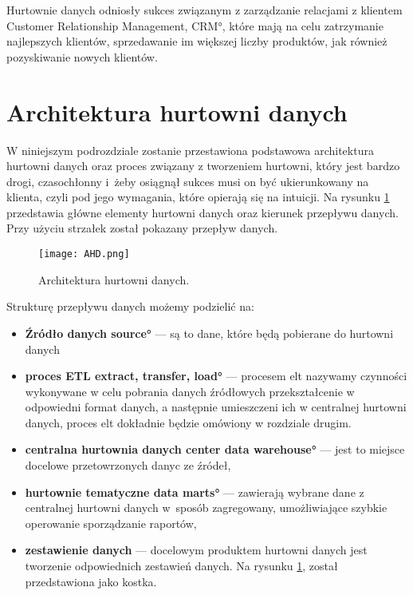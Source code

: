 Hurtownie danych odniosły sukces związanym z zarządzanie relacjami z klientem 
 \ang{Customer Relationship Management, CRM}, które mają na celu zatrzymanie najlepszych klientów,
 sprzedawanie im większej liczby produktów, jak również pozyskiwanie nowych klientów.

\section{Architektura hurtowni danych} \label{p_temat}
  W niniejszym podrozdziale zostanie przestawiona podstawowa architektura hurtowni danych oraz 
   proces związany z tworzeniem hurtowni, który jest bardzo drogi, czasochłonny 
   i~żeby osiągnął sukces musi on być ukierunkowany na klienta, czyli pod jego wymagania, 
   które opierają się na intuicji.
   Na rysunku \ref{fig:AHD} przedstawia główne elementy hurtowni danych oraz kierunek przepływu danych. Przy użyciu 
   strzałek został pokazany przepływ danych.

\begin{center}
\begin{figure}[H]
  \begin{center}
    \texttt{[image: AHD.png]}
  \end{center}
 \caption{Architektura hurtowni danych. }
    \label{fig:AHD}
\end{figure}
\end{center}


Strukturę przepływu danych możemy podzielić na:
\begin{itemize}
 \item \textbf{Źródło danych \ang{source} } --- 
        są to dane, które będą pobierane do hurtowni danych 
 \item \textbf{proces ETL \ang{extract, transfer, load} } --- 
    procesem elt nazywamy czynności wykonywane w celu pobrania danych źródłowych
    przekształcenie w odpowiedni format danych, a następnie umieszczeni ich w centralnej hurtowni danych,
    proces elt dokładnie będzie omówiony w rozdziale drugim.
 \item \textbf{centralna hurtownia danych \ang{center data  warehouse}} --- 
    jest to miejsce docelowe przetowrzonych danyc ze źródeł,						                                          
 \item \textbf{hurtownie tematyczne \ang{data marts}} --- 
    zawierają wybrane dane z centralnej hurtowni danych w~sposób 
    zagregowany, umożliwiające szybkie operowanie sporządzanie raportów,
 \item \textbf{zestawienie danych } --- 
    docelowym produktem hurtowni danych jest tworzenie odpowiednich zestawień danych.
    Na rysunku \ref{fig:AHD}, został przedstawiona jako kostka.
\end{itemize}


